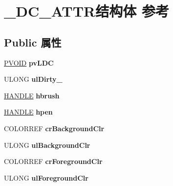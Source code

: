 \hypertarget{struct___d_c___a_t_t_r}{}\section{\+\_\+\+D\+C\+\_\+\+A\+T\+T\+R结构体 参考}
\label{struct___d_c___a_t_t_r}
\subsection*{Public 属性}
\begin{DoxyCompactItemize}
\item 
\mbox{\label{struct___d_c___a_t_t_r_a5be4f1822e43a78b0ce0fc360b8acf35}} 
\hyperlink{interfacevoid}{P\+V\+O\+ID} {\bfseries pv\+L\+DC}
\item 
\mbox{\label{struct___d_c___a_t_t_r_ac4e606ccfb37795a7c966c2fd415eecb}} 
U\+L\+O\+NG {\bfseries ul\+Dirty\+\_\+}
\item 
\mbox{\label{struct___d_c___a_t_t_r_a09124b93b119bdab276d6f52fedff643}} 
\hyperlink{interfacevoid}{H\+A\+N\+D\+LE} {\bfseries hbrush}
\item 
\mbox{\label{struct___d_c___a_t_t_r_a199484336dd05eb81673e8660b98cda3}} 
\hyperlink{interfacevoid}{H\+A\+N\+D\+LE} {\bfseries hpen}
\item 
\mbox{\label{struct___d_c___a_t_t_r_ab6ce21135ef11a1a20f79bb055e0299e}} 
C\+O\+L\+O\+R\+R\+EF {\bfseries cr\+Background\+Clr}
\item 
\mbox{\label{struct___d_c___a_t_t_r_a6efa36eed8eeff5e224a576ebc8cecb3}} 
U\+L\+O\+NG {\bfseries ul\+Background\+Clr}
\item 
\mbox{\label{struct___d_c___a_t_t_r_aaf584b4b0426786b381dab3a0b171811}} 
C\+O\+L\+O\+R\+R\+EF {\bfseries cr\+Foreground\+Clr}
\item 
\mbox{\label{struct___d_c___a_t_t_r_a91ecf85de929f7a5b01d2ced17e5675e}} 
U\+L\+O\+NG {\bfseries ul\+Foreground\+Clr}
\item 
\mbox{\label{struct___d_c___a_t_t_r_a7434e50efc37fd0af990a06f8080a2a7}} 

\end{DoxyCompactItemize}
